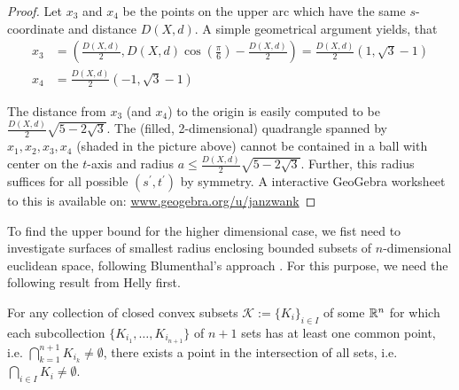 \begin{proof}
	Let $x_3$ and $x_4$ be the points on the upper arc which have the same $s$-coordinate and distance $D(X,d)$. A simple geometrical argument yields, that 
	\begin{align*}
	x_3&=\left(\frac{D(X,d)}{2},D(X,d)\cos\left(\frac{\pi}{6}\right)-\frac{D(X,d)}{2}\right)=\frac{D(X,d)}{2}(1,\sqrt{3}-1)\\
	x_4&=\frac{D(X,d)}{2}(-1,\sqrt{3}-1)
	\end{align*}
	
	The distance from $x_3$ (and $x_4$) to the origin is easily computed to be $\frac{D(X,d)}{2}\sqrt{5-2\sqrt{3}}$. The (filled, 2-dimensional) quadrangle spanned by $x_1, x_2,x_3,x_4$ (shaded in the picture above) cannot be contained in a ball with center on the $t$-axis and radius $a\leq \frac{D(X,d)}{2}\sqrt{5-2\sqrt{3}}$. Further, this radius suffices for all possible $(s^\prime,t^\prime)$ %
	by symmetry. %
	A interactive GeoGebra worksheet to this is available on: \url{www.geogebra.org/u/janzwank}
\end{proof} %


To find the upper bound for the higher dimensional case, we fist need to investigate surfaces of smallest radius enclosing bounded subsets of $n$-dimensional euclidean space, following Blumenthal's approach \cite{blumenthal}. For this purpose, we need the following result from Helly \cite{helly} first.

\begin{lemma}\label{lem:helly}
	For any collection of closed convex subsets $\mathcal{K}:=\{K_i\}_{i\in I}$ of some $\mathbb{R}^n$ for which each subcollection $\{K_{i_1},\dots,K_{i_{n+1}}\}$ of $n+1$ sets has at least one common point, i.e. $\bigcap\limits_{k=1}^{n+1} K_{i_k}\neq \emptyset$, there exists a point in the intersection of all sets, i.e. $\bigcap\limits_{i\in I} K_i\neq \emptyset$.
\end{lemma}

